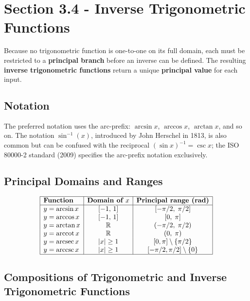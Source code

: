 \section{Section 3.4 - Inverse Trigonometric Functions}
\label{sec:sect-6b22}

Because no trigonometric function is one-to-one on its full domain, each must
be restricted to a \textbf{principal branch} before an inverse can be defined.
The resulting \textbf{inverse trigonometric functions} return a unique
\textbf{principal value} for each input.

\subsection*{Notation}

The preferred notation uses the arc-prefix: $\arcsin x$, $\arccos x$,
$\arctan x$, and so on.  The notation $\sin^{-1}(x)$, introduced by John
Herschel in 1813, is also common but can be confused with the reciprocal
$(\sin x)^{-1} = \csc x$; the ISO 80000-2 standard (2009) specifies the
arc-prefix notation exclusively.

\subsection*{Principal Domains and Ranges}

\[
  \begin{array}{|l|c|c|}
    \hline
    \textbf{Function} & \textbf{Domain of } x & \textbf{Principal range (rad)} \\
    \hline
    y = \arcsin x  & [-1,\,1] & [-\pi/2,\;\pi/2] \\
    y = \arccos x  & [-1,\,1] & [0,\;\pi] \\
    y = \arctan x  & \mathbb{R} & (-\pi/2,\;\pi/2) \\
    y = \operatorname{arccot} x & \mathbb{R} & (0,\;\pi) \\
    y = \operatorname{arcsec} x & |x| \geq 1 & [0,\pi]\setminus\{\pi/2\} \\
    y = \operatorname{arccsc} x & |x| \geq 1 & [-\pi/2,\pi/2]\setminus\{0\} \\
    \hline
  \end{array}
\]

\subsection*{Compositions of Trigonometric and Inverse Trigonometric
Functions}

